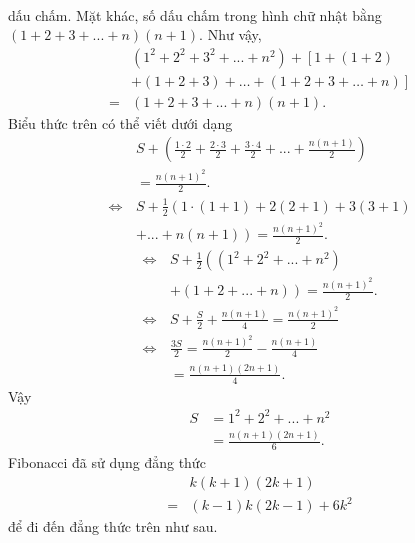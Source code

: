 \begin{multicols}{2}
\begin{align*}
	\end{align*}
	dấu chấm. Mặt khác, số dấu chấm trong hình chữ nhật bằng   $\left( {1 + 2 + 3 + ... + n} \right)\left( {n + 1} \right)$.
	\vskip 0.1cm 
	Như vậy, 
	\begin{align*}
			&\left( {{1^2} + {2^2} + {3^2} + ... + {n^2}} \right)+ \left[1 + \left( {1 + 2} \right) \right.\\[-0.6ex]
			&\left.+ \!\left( {1 \!+\! 2 \!+\! 3} \right) \!+\!  \ldots \! +\! \left( {1 \!+\! 2 \!+\! 3 \!+\!  \ldots  \!+\! n} \right) \right]\\[-0.6ex]
			=&\left( {1 + 2 + 3 + ... + n} \right)\left( {n + 1} \right).
	\end{align*}
	Biểu thức trên có thể viết dưới dạng
	\begin{align*}
		&S \!+\! \left(\!\frac{{1 \!\cdot\! 2}}{2} + \frac{{2 \!\cdot\! 3}}{2} + \frac{{3 \!\cdot\! 4}}{2} + ... + \frac{{n\left( {n + 1} \right)}}{2} \!\right) \\[-1ex]
		&= \frac{{n{{\left( {n + 1} \right)}^2}}}{2}.\\[-1ex]
		\Leftrightarrow\, &S + \frac{1}{2}\left( 1 \cdot \left( {1 + 1} \right) + 2\left( {2 + 1} \right) + 3\left( {3 + 1} \right)\right. \\[-1ex]
		&\left.+ ... + n\left( {n + 1} \right) \right)= \frac{{n{{\left( {n + 1} \right)}^2}}}{2}.
	\end{align*}
	\begin{align*}
		\Leftrightarrow \,&S + \frac{1}{2}\left( \left( {{1^2} + {2^2} + ... + {n^2}} \right)\right. \\
		&\left.+ \left( {1 + 2 + ... + n} \right) \right) = \frac{{n{{\left( {n + 1} \right)}^2}}}{2}.\\
		\Leftrightarrow \,&S + \frac{S}{2} + \frac{{n\left( {n + 1} \right)}}{4} = \frac{{n{{\left( {n + 1} \right)}^2}}}{2}\\
		\Leftrightarrow \,&\frac{{3S}}{2} = \frac{{n{{\left( {n + 1} \right)}^2}}}{2} - \frac{{n\left( {n + 1} \right)}}{4} \\
		&= \frac{{n\left( {n + 1} \right)\left( {2n + 1} \right)}}{4}.
	\end{align*}
	Vậy 
	\begin{align*}
		S &= {1^2} + {2^2} + ... + {n^2} \\
		&= \frac{{n\left( {n + 1} \right)\left( {2n + 1} \right)}}{6}. \tag{$2$}
	\end{align*}
	Fibonacci đã sử dụng đẳng thức
	\begin{align*}
		&k(k + 1)(2k + 1) \\
		= &(k - 1)k(2k - 1) + 6{k^2} \tag{$*$}
	\end{align*}
	để đi đến đẳng thức trên như sau.
	

\end{multicols}
